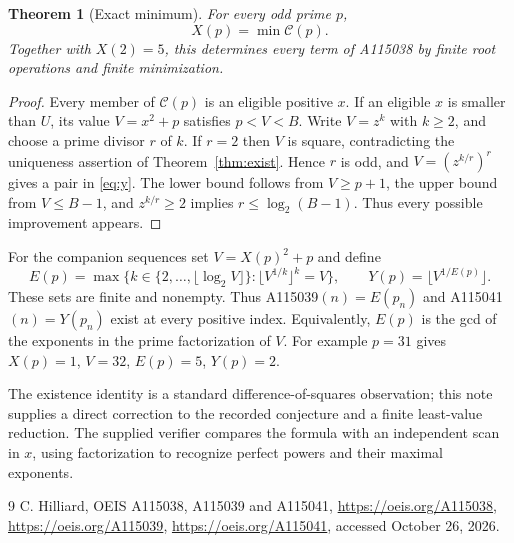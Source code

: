 \documentclass[10pt]{article}
\newtheorem{theorem}{Theorem}
\begin{document}
\begin{theorem}[Exact minimum]\label{thm:min}
For every odd prime $p$,
\begin{equation}\label{eq:min}
 X(p)=\min\mathcal C(p).
\end{equation}
Together with $X(2)=5$, this determines every term of A115038 by finite
root operations and finite minimization.
\end{theorem}
\begin{proof}
Every member of $\mathcal C(p)$ is an eligible positive $x$. If an
eligible $x$ is smaller than $U$, its value $V=x^2+p$ satisfies
$p<V<B$. Write $V=z^k$ with $k\ge2$, and choose a prime divisor $r$ of
$k$. If $r=2$ then $V$ is square, contradicting the uniqueness assertion
of Theorem~\ref{thm:exist}. Hence $r$ is odd, and
$V=(z^{k/r})^r$ gives a pair in \eqref{eq:y}. The lower bound follows
from $V\ge p+1$, the upper bound from $V\le B-1$, and $z^{k/r}\ge2$
implies $r\le\log_2(B-1)$. Thus every possible improvement appears.
\end{proof}

For the companion sequences set $V=X(p)^2+p$ and define
\[
 E(p)=\max\{k\in\{2,\ldots,\lfloor\log_2V\rfloor\}:
                \lfloor V^{1/k}\rfloor^k=V\},\qquad
 Y(p)=\lfloor V^{1/E(p)}\rfloor.
\]
These sets are finite and nonempty. Thus A115039$(n)=E(p_n)$ and
A115041$(n)=Y(p_n)$ exist at every positive index. Equivalently, $E(p)$
is the gcd of the exponents in the prime factorization of $V$.
For example $p=31$ gives $X(p)=1$, $V=32$, $E(p)=5$, $Y(p)=2$.

The existence identity is a standard difference-of-squares observation;
this note supplies a direct correction to the recorded conjecture and a
finite least-value reduction. The supplied verifier compares the formula
with an independent scan in $x$, using factorization to recognize perfect
powers and their maximal exponents.

\begin{thebibliography}{9}
 C. Hilliard, OEIS A115038, A115039 and A115041,
\url{https://oeis.org/A115038}, \url{https://oeis.org/A115039},
\url{https://oeis.org/A115041}, accessed October 26, 2026.
\end{thebibliography}
\end{document}
